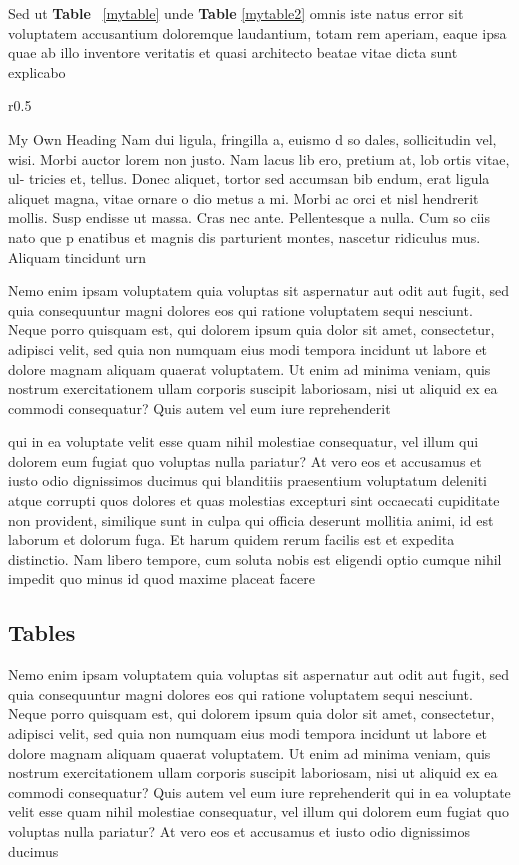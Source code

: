 \documentclass[12pt,a4paper]{report}
\begin{document}
Sed ut \textbf{Table} ~\ref{mytable} unde \textbf{Table} \ref{mytable2} omnis iste natus error sit voluptatem accusantium doloremque laudantium, totam rem aperiam, eaque ipsa quae ab illo inventore veritatis et quasi architecto beatae vitae dicta sunt explicabo
%
\begin{wrapfigure}{r}{0.5\textwidth}
	\begin{sidebar}{My Own Heading}
	Nam dui ligula, fringilla a, euismo d so dales, sollicitudin vel, wisi. Morbi auctor lorem non justo. Nam lacus lib ero, pretium at, lob ortis vitae, ul- tricies et, tellus. Donec aliquet, tortor sed accumsan bib endum, erat ligula aliquet magna, vitae ornare o dio metus a mi. Morbi ac orci et nisl hendrerit mollis. Susp endisse ut massa. Cras nec ante. Pellentesque a nulla. Cum so ciis nato que p enatibus et magnis dis parturient montes, nascetur ridiculus mus. Aliquam tincidunt urn
\end{sidebar}
\end{wrapfigure}
%
Nemo enim ipsam voluptatem quia voluptas sit aspernatur aut odit aut fugit, sed quia consequuntur magni dolores eos qui ratione voluptatem sequi nesciunt. Neque porro quisquam est, qui dolorem ipsum quia dolor sit amet, consectetur, adipisci velit, sed quia non numquam eius modi tempora incidunt ut labore et dolore magnam aliquam quaerat voluptatem. Ut enim ad minima veniam, quis nostrum exercitationem ullam corporis suscipit laboriosam, nisi ut aliquid ex ea commodi consequatur? Quis autem vel eum iure reprehenderit 

qui in ea voluptate velit esse quam nihil molestiae consequatur, vel illum qui dolorem eum fugiat quo voluptas nulla pariatur? At vero eos et accusamus et iusto odio dignissimos ducimus qui blanditiis praesentium voluptatum deleniti atque corrupti quos dolores et quas molestias excepturi sint occaecati cupiditate non provident, similique sunt in culpa qui officia deserunt mollitia animi, id est laborum et dolorum fuga. Et harum quidem rerum facilis est et expedita distinctio. Nam libero tempore, cum soluta nobis est eligendi optio cumque nihil impedit quo minus id quod maxime placeat facere
%
\subsection{Tables}
%
Nemo enim ipsam voluptatem quia voluptas sit aspernatur aut odit aut fugit, sed quia consequuntur magni dolores eos qui ratione voluptatem sequi nesciunt. Neque porro quisquam est, qui dolorem ipsum quia dolor sit amet, consectetur, adipisci velit, sed quia non numquam eius modi tempora incidunt ut labore et dolore magnam aliquam quaerat voluptatem. Ut enim ad minima veniam, quis nostrum exercitationem ullam corporis suscipit laboriosam, nisi ut aliquid ex ea commodi consequatur? Quis autem vel eum iure reprehenderit qui in ea voluptate velit esse quam nihil molestiae consequatur, vel illum qui dolorem eum fugiat quo voluptas nulla pariatur? At vero eos et accusamus et iusto odio dignissimos ducimus \\
\end{document}
